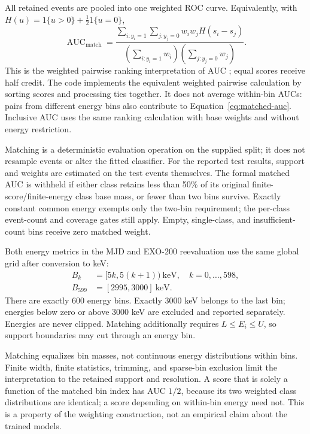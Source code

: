 All retained events are pooled into one weighted ROC curve. Equivalently,
with $H(u)=\mathrm{1}\{u>0\}+\tfrac12\mathrm{1}\{u=0\}$,
\begin{equation}
 \operatorname{AUC}_{\mathrm{match}}=
 \frac{\displaystyle\sum_{i:y_i=1}\sum_{j:y_j=0}
 w_iw_j H(s_i-s_j)}
 {\displaystyle\left(\sum_{i:y_i=1}w_i\right)
 \left(\sum_{j:y_j=0}w_j\right)}.
 \label{eq:matched-auc}
\end{equation}
This is the weighted pairwise ranking interpretation of AUC
\citep{hanley1982meaning}; equal scores receive half credit. The code implements the equivalent weighted pairwise calculation by
sorting scores and processing ties together. It does not average within-bin AUCs: pairs from different
energy bins also contribute to Equation~\ref{eq:matched-auc}.
Inclusive AUC uses the same ranking calculation with base weights and without
energy restriction.

Matching is a deterministic evaluation operation on the supplied split;
it does not resample events or alter the fitted classifier. For the reported
test results, support and weights are estimated on the test events themselves.
The formal matched AUC is withheld if either class retains less than 50\% of
its original finite-score/finite-energy class base mass, or fewer than two
bins survive. Exactly constant common energy exempts only the two-bin
requirement; the per-class event-count and coverage gates still apply.
Empty, single-class, and insufficient-count bins receive zero matched weight.

Both energy metrics in the MJD and EXO-200 reevaluation use the same global
grid after conversion to keV:
\begin{align}
 B_k&=[5k,5(k+1))\ \mathrm{keV},\quad k=0,\ldots,598,\\
 B_{599}&=[2995,3000]\ \mathrm{keV}.
 \label{eq:fixed-bins}
\end{align}
There are exactly 600 energy bins. Exactly 3000 keV belongs to the last bin;
energies below zero or above 3000 keV are excluded and reported separately.
Energies are never clipped. Matching additionally requires
$L\leq E_i\leq U$, so support boundaries may cut through an energy bin.

Matching equalizes bin masses, not continuous energy distributions within
bins. Finite width, finite statistics, trimming, and sparse-bin exclusion
limit the interpretation to the retained support and resolution. A score
that is solely a function of the matched bin index has AUC $1/2$, because
its two weighted class distributions are identical; a score depending on
within-bin energy need not. This is a property of the weighting construction,
not an empirical claim about the trained models.

